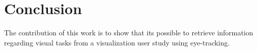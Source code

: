 \section{Conclusion}
The contribution of this work is to show that its possible to retrieve information regarding visual tasks from a visualization user study using eye-tracking. 